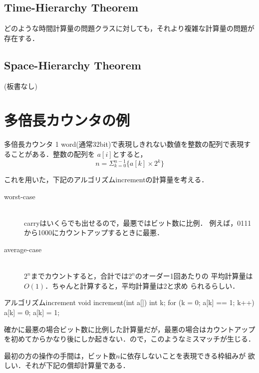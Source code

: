 \subsection{Time-Hierarchy Theorem}
どのような時間計算量の問題クラスに対しても，それより複雑な計算量の問題が
存在する．

\subsection{Space-Hierarchy Theorem}
(板書なし)

\section{多倍長カウンタの例}

\begin{myexample}{多倍長カウンタ}
1 word(通常32bit)で表現しきれない数値を整数の配列で表現することがある．整数の配列を
 $a[i]$とすると，
 \[
  n = \Sigma^{n-1}_{k=0} \{a[k] \times 2^k\}
 \]

 これを用いた，下記のアルゴリズムincrementの計算量を考える．

 \begin{description}
 
  \item[worst-case] \mbox{} \\
             carryはいくらでも出せるので，最悪ではビット数に比例．
             例えば，0111から1000にカウントアップするときに最悪．
  \item[average-case]\mbox{} \\
             $2^n$までカウントすると，合計では$2^n$のオーダー1回あたりの
             平均計算量は$O(1)$．ちゃんと計算すると，平均計算量は2と求め
             られるらしい．
 \end{description}

\end{myexample}

\begin{mypre}{アルゴリズムincrement}
void increment(int a[])
{
    int k;
    for (k = 0; a[k] == 1; k++)
        a[k] = 0;
    a[k] = 1;
}
\end{mypre}

確かに最悪の場合ビット数に比例した計算量だが，最悪の場合はカウントアップ
を初めてからかなり後にしか起きない．ので，このようなミスマッチが生じる．

最初の方の操作の手間は，ビット数$n$に依存しないことを表現できる枠組みが
欲しい．それが下記の償却計算量である．


